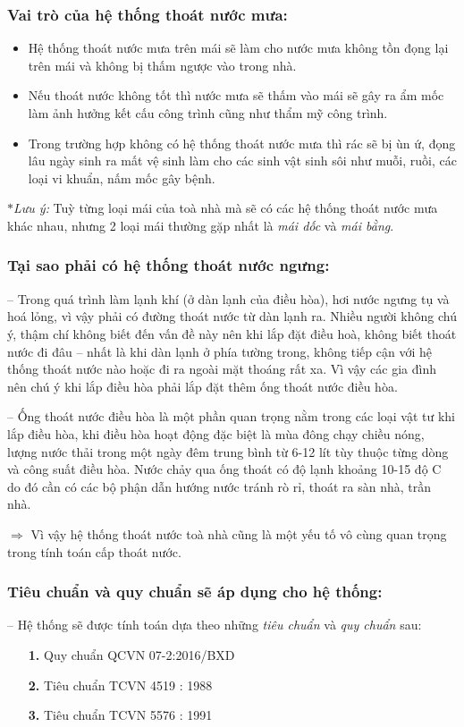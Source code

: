 	\subsubsection{Vai trò của hệ thống thoát nước mưa:}
	\begin{itemize}
		\vspace{-2mm}
		\setlength\itemsep{1mm}
		\item Hệ thống thoát nước mưa trên mái sẽ làm cho nước mưa không tồn đọng lại trên mái và không bị thấm ngược vào trong nhà.
		\item Nếu thoát nước không tốt thì nước mưa sẽ thấm vào mái sẽ gây ra ẩm mốc làm ảnh hưởng kết cấu công trình cũng như thẩm mỹ công trình.
		\item Trong trường hợp không có hệ thống thoát nước mưa thì rác sẽ bị ùn ứ, đọng lâu ngày sinh ra mất vệ sinh làm cho các sinh vật sinh sôi như muỗi, ruồi, các loại vi khuẩn, nấm mốc gây bệnh.
	\end{itemize}
	
	$\ast$\textit{Lưu ý:} Tuỳ từng loại mái của toà nhà mà sẽ có các hệ thống thoát nước mưa khác nhau, nhưng 2 loại mái thường gặp nhất là \emph{mái dốc} và \emph{mái bằng}.
	
	\subsubsection{Tại sao phải có hệ thống thoát nước ngưng:}
	-- Trong quá trình làm lạnh khí (ở dàn lạnh của điều hòa), hơi nước ngưng tụ và hoá lỏng, vì vậy phải có đường thoát nước từ dàn lạnh ra. Nhiều người không chú ý, thậm chí không biết đến vấn đề này nên khi lắp đặt điều hoà, không biết thoát nước đi đâu – nhất là khi dàn lạnh ở phía tường trong, không tiếp cận với hệ thống thoát nước nào hoặc đi ra ngoài mặt thoáng rất xa. Vì vậy các gia đình nên chú ý khi lắp điều hòa phải lắp đặt thêm ống thoát nước điều hòa.

-- Ống thoát nước điều hòa là một phần quan trọng nằm trong các loại vật tư khi lắp điều hòa, khi điều hòa hoạt động đặc biệt là mùa đông chạy chiều nóng, lượng nước thải trong một ngày đêm trung bình từ 6-12 lít tùy thuộc từng dòng và công suất điều hòa. Nước chảy qua ống thoát có độ lạnh khoảng 10-15 độ C do đó cần có các bộ phận dẫn hướng nước tránh rò rỉ, thoát ra sàn nhà, trần nhà.
	
	$\pmb{\Rightarrow}$ Vì vậy hệ thống thoát nước toà nhà cũng là một yếu tố vô cùng quan trọng trong tính toán cấp thoát nước.
	
	\subsubsection{Tiêu chuẩn và quy chuẩn sẽ áp dụng cho hệ thống:}
	-- Hệ thống sẽ được tính toán dựa theo những \emph{tiêu chuẩn} và \emph{quy chuẩn} sau:
	\begin{itemize}
		\item[\textbf{1.}]Quy chuẩn QCVN 07-2:2016/BXD
		\item[\textbf{2.}]Tiêu chuẩn TCVN 4519 : 1988
		\item[\textbf{3.}]Tiêu chuẩn TCVN 5576 : 1991
	\end{itemize}
